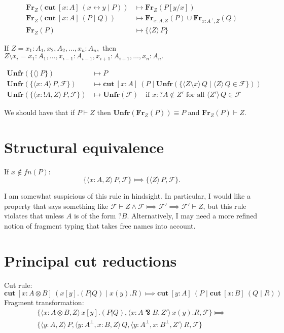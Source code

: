 \documentclass{article}
\newcommand{\cut}[4]{\mathbf{cut}\: [#1:#2] \: (#3 \mid #4)}
\newcommand{\fragment}[2]{\langle #1 \rangle \, #2}
\def\tensor{\otimes}
\def\parr{\bindnasrepma}
\def\link{\leftrightarrow}
\def\goesto{\Longmapsto}
\def\F{\mathcal{F}}
\def\Fr{\mathbf{Fr}}
\def\Unfr{\mathbf{Unfr}}
\begin{document}
\begin{align*}
  \Fr_Z(\cut{x}{A}{x \link y}{P}) &\mapsto \Fr_Z(P[y/x]) \\
  \Fr_Z(\cut{x}{A}{P}{Q}) &\mapsto \Fr_{x:A,Z}(P) \cup \Fr_{x:A^\perp,Z}(Q) \\
  \Fr_Z(P) &\mapsto \{ \fragment{Z}{P} \}
\end{align*}

\noindent
If \(Z = x_1:A_1, x_2,A_2, \dots, x_n:A_n,\) then \(Z \setminus x_i = x_1:A_1,\dots,x_{i-1}:A_{i-1},x_{i+1}:A_{i+1},\dots,x_n:A_n.\)

\begin{align*}
  \Unfr(\{\fragment{}{P}\}) &\mapsto P \\
  \Unfr(\{\fragment{x:A}{P},\F\}) &\mapsto \cut{x}{A}{P}{\Unfr(\{\fragment{Z \setminus x}{Q} \mid \fragment{Z}{Q} \in \F\})} \\
  \Unfr(\{\fragment{x:{!A},Z}{P},\F\}) &\mapsto \Unfr(\F) \quad \text{if $x:{?A} \notin Z'$ for all $\fragment{Z'}{Q} \in \F$}
\end{align*}

We should have that if $P \vdash Z$ then $\Unfr(\Fr_Z(P)) \equiv P$ and $\Fr_Z(P) \vdash Z$.

\section{Structural equivalence}

If $x \not\in fn(P)$:
\[ \{ \fragment{x:A,Z}{P}, \F \} \goesto \{ \fragment{Z}{P}, \F \}. \]

I am somewhat suspicious of this rule in hindsight.  In particular, I would like a property that
says something like $\F \vdash Z \land \F \goesto \F' \implies \F' \vdash Z$, but this rule violates
that unless $A$ is of the form $?B$.  Alternatively, I may need a more refined notion of fragment
typing that takes free names into account.

\section{Principal cut reductions}

Cut rule:
\[ \cut{x}{A \tensor B}{x[y].(P|Q)}{x(y).R} \goesto \cut{y}{A}{P}{\cut{x}{B}{Q}{R}} \]
Fragment transformation:
\begin{multline*}
 \{\fragment{x:A \tensor B,Z}{x[y].(P|Q)}, \fragment{x:A \parr B,Z'}{x(y).R}, \F \} \goesto \\
 \{\fragment{y:A,Z}{P}, \fragment{y:A^\perp,x:B,Z}{Q}, \fragment{y:A^\perp,x:B^\perp,Z'}{R}, \F \}
\end{multline*}
\end{document}
